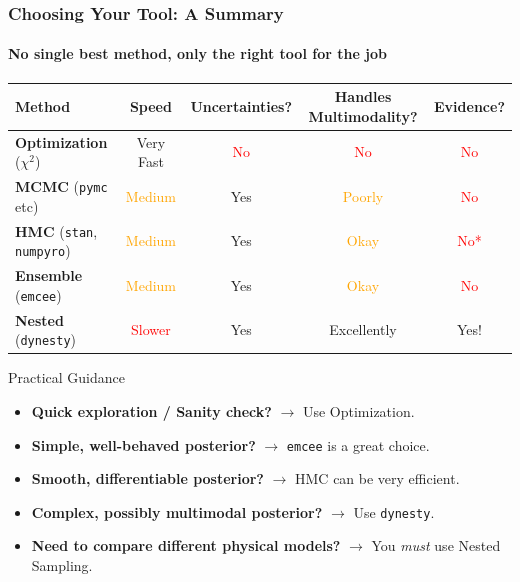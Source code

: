 \documentclass[aspectratio=169]{beamer}
\begin{document}
\begin{frame}
    \frametitle{Choosing Your Tool: A Summary}
    \framesubtitle{No single best method, only the right tool for the job}
    \begin{center}
        \begin{tabular}{|l|c|c|c|c|}
            \hline
            \textbf{Method} & \textbf{Speed} & \textbf{Uncertainties?} & \textbf{Handles Multimodality?} & \textbf{Evidence?} \\
            \hline
            \textbf{Optimization} ($\chi^2$) & \textcolor{green!50!black}{Very Fast} & \textcolor{red}{No} & \textcolor{red}{No} & \textcolor{red}{No} \\
            \hline
            \textbf{MCMC} (\texttt{pymc} etc) & \textcolor{orange}{Medium} & \textcolor{green!50!black}{Yes} & \textcolor{orange}{Poorly} & \textcolor{red}{No} \\
            \hline
            \textbf{HMC} (\texttt{stan}, \texttt{numpyro}) & \textcolor{orange}{Medium} & \textcolor{green!50!black}{Yes} & \textcolor{orange}{Okay} & \textcolor{red}{No*} \\
            \hline
            \textbf{Ensemble} (\texttt{emcee}) & \textcolor{orange}{Medium} & \textcolor{green!50!black}{Yes} & \textcolor{orange}{Okay} & \textcolor{red}{No} \\
            \hline
            \textbf{Nested} (\texttt{dynesty}) & \textcolor{red}{Slower} & \textcolor{green!50!black}{Yes} & \textcolor{green!50!black}{Excellently} & \textcolor{green!50!black}{Yes!} \\
            \hline
        \end{tabular}
    \end{center}
    \begin{block}{Practical Guidance}
        \begin{itemize}
            \item \textbf{Quick exploration / Sanity check?} $\rightarrow$ Use Optimization.
            \item \textbf{Simple, well-behaved posterior?} $\rightarrow$ \texttt{emcee} is a great choice.
            \item \textbf{Smooth, differentiable posterior?} $\rightarrow$ HMC can be very efficient.
            \item \textbf{Complex, possibly multimodal posterior?} $\rightarrow$ Use \texttt{dynesty}.
            \item \textbf{Need to compare different physical models?} $\rightarrow$ You \textit{must} use Nested Sampling.
        \end{itemize}
    \end{block}
\end{frame}
\end{document}
